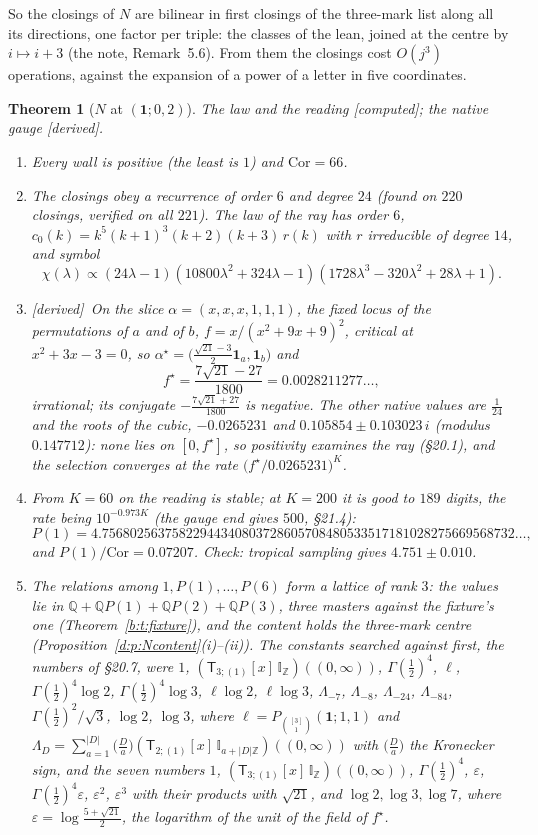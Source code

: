 \documentclass[11pt]{article}
\newcommand{\one}{\mathbf 1}
\newcommand{\sT}{\mathsf T}
\newcommand{\IZ}{\mathbb I_{\mathbb Z}}
\newcommand{\Ilat}[1]{\mathbb I_{#1}}
\newcommand{\Tx}[3]{(\sT_{#1;(1)}[x]\,#2)((#3,\infty))}
\newcommand{\Pth}{P_{\binom{[3]}1}(\one;1,1)}
\theoremstyle{plain}
\newtheorem{theorem}[proposition]{Theorem}
\theoremstyle{definition}
\theoremstyle{remark}
\newcommand{\derived}{\textup{[derived]}}
\newcommand{\computed}{\textup{[computed]}}
\begin{document}
\noindent So the closings of $N$ are bilinear in first closings of the three-mark list along all its directions, one factor per triple: the classes of the lean, joined at the centre by $i\mapsto i+3$ (the note, Remark~5.6). From them the closings cost $O(j^3)$ operations, against the expansion of a power of a letter in five coordinates.

\begin{theorem}[$N$ at $(\one;0,2)$]\label{b:t:Nlean}The law and the reading \computed; the native gauge \derived.\
\begin{enumerate}[label=(\roman*)]
\item Every wall is positive (the least is $1$) and $\mathrm{Cor}=66$.
\item The closings obey a recurrence of order $6$ and degree $24$ (found on $220$ closings, verified on all $221$). The law of the ray has order $6$, $c_0(k)=k^5(k+1)^3(k+2)(k+3)\,r(k)$ with $r$ irreducible of degree $14$, and symbol
\[
\chi(\lambda)\propto(24\lambda-1)(10800\lambda^2+324\lambda-1)(1728\lambda^3-320\lambda^2+28\lambda+1).
\]
\item \derived\ On the slice $\alpha=(x,x,x,1,1,1)$, the fixed locus of the permutations of $a$ and of $b$, $f=x/(x^2+9x+9)^2$, critical at $x^2+3x-3=0$, so $\alpha^\star=\big(\tfrac{\sqrt{21}-3}2\one_a,\one_b\big)$ and
\[
f^\star=\frac{7\sqrt{21}-27}{1800}=0.0028211277\ldots,
\]
irrational; its conjugate $-\frac{7\sqrt{21}+27}{1800}$ is negative. The other native values are $\frac1{24}$ and the roots of the cubic, $-0.0265231$ and $0.105854\pm0.103023\,i$ (modulus $0.147712$): none lies on $[0,f^\star]$, so positivity examines the ray (\S20.1), and the selection converges at the rate $\big(f^\star/0.0265231\big)^K$.
\item From $K=60$ on the reading is stable; at $K=200$ it is good to $189$ digits, the rate being $10^{-0.973K}$ (the gauge end gives $500$, \S21.4):
\[
P(1)=4.75680256375822944340803728605708480533517181028275669568732\ldots,
\]
and $P(1)/\mathrm{Cor}=0.07207$. Check: tropical sampling gives $4.751\pm0.010$.
\item The relations among $1,P(1),\dots,P(6)$ form a lattice of rank $3$: the values lie in $\mathbb Q+\mathbb QP(1)+\mathbb QP(2)+\mathbb QP(3)$, three masters against the fixture's one (Theorem~\ref{b:t:fixture}), and the content holds the three-mark centre (Proposition~\ref{d:p:Ncontent}(i)--(ii)). The constants searched against first, the \emph{numbers of \S20.7}, were $1$, $\Tx3{\IZ}0$, $\Gamma(\frac12)^4$, $\ell$, $\Gamma(\frac12)^4\log2$, $\Gamma(\frac12)^4\log3$, $\ell\log2$, $\ell\log3$, $\Lambda_{-7}$, $\Lambda_{-8}$, $\Lambda_{-24}$, $\Lambda_{-84}$, $\Gamma(\frac12)^2/\sqrt3$, $\log2$, $\log3$, where $\ell=\Pth$ and $\Lambda_D=\sum_{a=1}^{|D|}\big(\frac Da\big)\Tx2{\Ilat{a+|D|\mathbb Z}}0$ with $\big(\frac Da\big)$ the Kronecker sign, and the seven numbers $1$, $\Tx3{\IZ}0$, $\Gamma(\frac12)^4$, $\varepsilon$, $\Gamma(\frac12)^4\varepsilon$, $\varepsilon^2$, $\varepsilon^3$ with their products with $\sqrt{21}$, and $\log2,\log3,\log7$, where $\varepsilon=\log\frac{5+\sqrt{21}}2$, the logarithm of the unit of the field of $f^\star$.
\end{enumerate}
\end{theorem}
\end{document}
